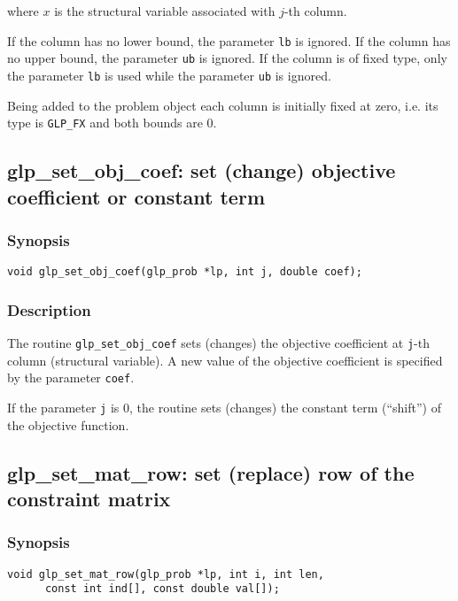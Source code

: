 \noindent
where $x$ is the structural variable associated with $j$-th column.

If the column has no lower bound, the parameter \verb|lb| is ignored.
If the column has no upper bound, the parameter \verb|ub| is ignored.
If the column is of fixed type, only the parameter \verb|lb| is used
while the parameter \verb|ub| is ignored.

Being added to the problem object each column is initially fixed at
zero, i.e. its type is \verb|GLP_FX| and both bounds are 0.

\subsection{glp\_set\_obj\_coef: set (change) objective coefficient
or constant term}

\subsubsection*{Synopsis}

\begin{verbatim}
void glp_set_obj_coef(glp_prob *lp, int j, double coef);
\end{verbatim}

\subsubsection*{Description}

The routine \verb|glp_set_obj_coef| sets (changes) the objective
coefficient at \verb|j|-th column (structural variable). A new value of
the objective coefficient is specified by the parameter \verb|coef|.

If the parameter \verb|j| is 0, the routine sets (changes) the constant
term (``shift'') of the objective function.

\subsection{glp\_set\_mat\_row: set (replace) row of the constraint
matrix}

\subsubsection*{Synopsis}

\begin{verbatim}
void glp_set_mat_row(glp_prob *lp, int i, int len,
      const int ind[], const double val[]);
\end{verbatim}

